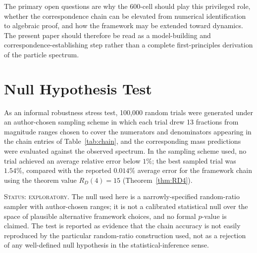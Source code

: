 \documentclass[12pt]{article}
\begin{document}
The primary open questions are why the 600-cell should play this privileged role, whether the correspondence chain can be elevated from numerical identification to algebraic proof, and how the framework may be extended toward dynamics. The present paper should therefore be read as a model-building and correspondence-establishing step rather than a complete first-principles derivation of the particle spectrum.

\appendix
\section{Null Hypothesis Test}\label{app:null}

As an informal robustness stress test, 100{,}000 random trials were generated under an author-chosen sampling scheme in which each trial drew 13 fractions from magnitude ranges chosen to cover the numerators and denominators appearing in the chain entries of Table~\ref{tab:chain}, and the corresponding mass predictions were evaluated against the observed spectrum. In the sampling scheme used, no trial achieved an average relative error below $1\%$; the best sampled trial was $1.54\%$, compared with the reported $0.014\%$ average error for the framework chain using the theorem value $R_D(4) = 15$ (Theorem~\ref{thm:RD4}).

\textsc{Status: exploratory.} The null used here is a narrowly-specified random-ratio sampler with author-chosen ranges; it is not a calibrated statistical null over the space of plausible alternative framework choices, and no formal $p$-value is claimed. The test is reported as evidence that the chain accuracy is not easily reproduced by the particular random-ratio construction used, not as a rejection of any well-defined null hypothesis in the statistical-inference sense.



\end{document}
